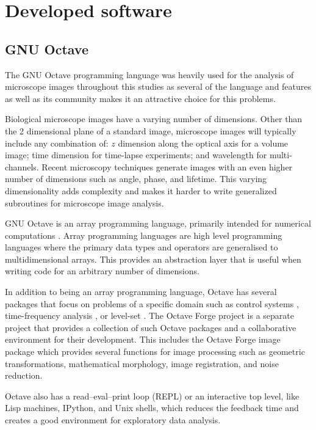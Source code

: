 \chapter{Developed software}

\section{GNU Octave}

The GNU Octave programming language was heavily used for the analysis
of microscope images throughout this studies as several of the
language and features as well as its community makes it an attractive
choice for this problems.

Biological microscope images have a varying number of dimensions.
Other than the 2 dimensional plane of a standard image, microscope
images will typically include any combination of: $z$ dimension along
the optical axis for a volume image; time dimension for time-lapse
experiments; and wavelength for multi-channels.  Recent microscopy
techniques generate images with an even higher number of dimensions
such as angle, phase, and lifetime.  This varying dimensionality adds
complexity and makes it harder to write generalized subroutines for
microscope image analysis.

GNU Octave is an array programming language, primarily intended for
numerical computations \citep{octave}.  Array programming languages
are high level programming languages where the primary data types and
operators are generalised to multidimensional arrays.  This provides
an abstraction layer that is useful when writing code for an arbitrary
number of dimensions.

In addition to being an array programming language, Octave has several
packages that focus on problems of a specific domain such as control
systems \citep{octave-control}, time-frequency analysis
\citep{octave-ltfat}, or level-set \citep{octave-level-set}.  The
Octave Forge project is a separate project that provides a collection
of such Octave packages and a collaborative environment for their
development.  This includes the Octave Forge image package which
provides several functions for image processing such as geometric
transformations, mathematical morphology, image registration, and
noise reduction.

Octave also has a read–eval–print loop (REPL) or an interactive top
level, like Lisp machines, IPython, and Unix shells, which reduces the
feedback time and creates a good environment for exploratory data analysis.

